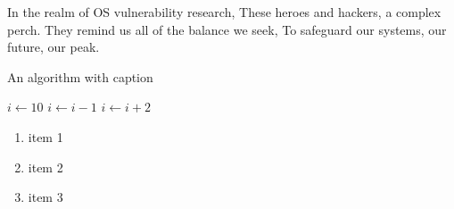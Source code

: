 \documentclass[english]{assignmentreport}
\begin{document}
In the realm of OS vulnerability research,
These heroes and hackers, a complex perch.
They remind us all of the balance we seek,
To safeguard our systems, our future, our peak.
\begin{algorithm}[htbp]
\begin{algorithmic}[1]
\caption{An algorithm with caption}
    \State $i \gets 10$
        \State $i \gets i-1$
    \Else
            \State $i \gets i+2$
        \EndIf
    \EndIf 
\end{algorithmic}
\end{algorithm}

\begin{enumerate}
    \item item 1
    \item item 2
    \item item 3
\end{enumerate}
\end{document}
